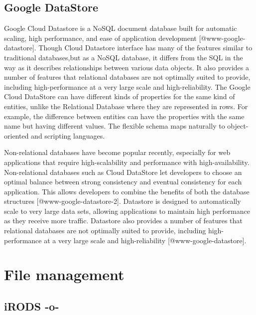 \subsection{Google DataStore}

Google Cloud Datastore is a NoSQL document database built for
automatic scaling, high performance, and ease of application
development [@www-google-datastore]. Though Cloud Datastore
interface has many of the features similar to traditional
databases,but as a NoSQL database, it differs from the SQL in the way
as it describes relationships between various data objects. It also
provides a number of features that relational databases are not
optimally suited to provide, including high-performance at a very
large scale and high-reliability. The Google Cloud DataStore can have
different kinds of properties for the same kind of entities, unlike
the Relational Database where they are represented in rows. For
example, the difference between entities can have the properties with
the same name but having different values. The flexible schema maps
naturally to object-oriented and scripting languages.

Non-relational databases have become popular recently, especially for
web applications that require high-scalability and performance with
high-availability. Non-relational databases such as Cloud DataStore
let developers to choose an optimal balance between strong consistency
and eventual consistency for each application. This allows developers
to combine the benefits of both the database
structures [@www-google-datastore-2].  Datastore is designed to
automatically scale to very large data sets, allowing applications to
maintain high performance as they receive more traffic. Datastore also
provides a number of features that relational databases are not
optimally suited to provide, including high-performance at a very
large scale and high-reliability [@www-google-datastore].

\section{File management}


\subsection{iRODS -o-}

